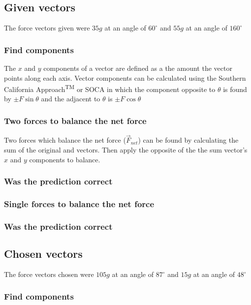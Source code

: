\documentclass[11pt, letterpaper, includehead]{article}
\begin{document}
\subsection{Given vectors} %
The force vectors given were $35g$ at an angle of $60^{\circ}$ and $55g$ at an angle of $160^{\circ}$

\subsubsection{Find components} %
The $x$ and $y$ components of a vector are defined as a the amount the vector 
points along each axis. Vector components can be calculated using the Southern 
California Approach\textsuperscript{TM} or SOCA in which the component opposite to
$\theta$ is found by $\pm F \sin\theta$ and the adjacent to $\theta$ is $\pm F \cos\theta$

\subsubsection{Two forces to balance the net force} %
Two forces which balance the net force ($\vec{F}_{net}$) can be found by calculating the sum of 
the original and vectors. Then apply the opposite of the the sum vector's $x$ and $y$ components to balance.

\subsubsection{Was the prediction correct} %

\subsubsection{Single forces to balance the net force} %

\subsubsection{Was the prediction correct} %

\subsection{Chosen vectors} %
The force vectors chosen were $105g$ at an angle of $87^{\circ}$ and $15g$ at an angle of $48^{\circ}$

\subsubsection{Find components} %
\end{document}
